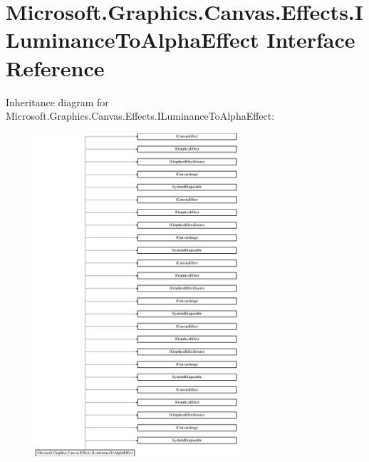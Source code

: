 \hypertarget{interface_microsoft_1_1_graphics_1_1_canvas_1_1_effects_1_1_i_luminance_to_alpha_effect}{}\section{Microsoft.\+Graphics.\+Canvas.\+Effects.\+I\+Luminance\+To\+Alpha\+Effect Interface Reference}
\label{interface_microsoft_1_1_graphics_1_1_canvas_1_1_effects_1_1_i_luminance_to_alpha_effect}
Inheritance diagram for Microsoft.\+Graphics.\+Canvas.\+Effects.\+I\+Luminance\+To\+Alpha\+Effect\+:\begin{figure}[H]
\begin{center}
\leavevmode
\includegraphics[height=12.000000cm]{interface_microsoft_1_1_graphics_1_1_canvas_1_1_effects_1_1_i_luminance_to_alpha_effect}
\end{center}
\end{figure}
